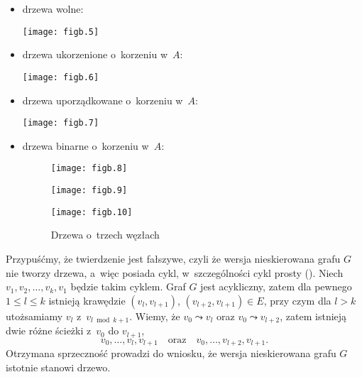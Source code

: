\exercise %
\begin{itemize}
	\item drzewa wolne:
	\begin{center}
		\texttt{[image: figb.5]}
	\end{center}
	\item drzewa ukorzenione o~korzeniu w~$A$:
	\begin{center}
		\texttt{[image: figb.6]}
	\end{center}
	\item drzewa uporządkowane o~korzeniu w~$A$:
	\begin{center}
		\texttt{[image: figb.7]}
	\end{center}
	\item drzewa binarne o~korzeniu w~$A$:
	\begin{figure}[ht]
		\begin{center}
			\texttt{[image: figb.8]}
		\end{center}
		\begin{center}
			\texttt{[image: figb.9]}
		\end{center}
		\begin{center}
			\texttt{[image: figb.10]}
		\end{center}
		\caption{Drzewa o~trzech węzłach}
	\end{figure}
\end{itemize}

\exercise %
Przypuśćmy, że twierdzenie jest fałszywe, czyli że wersja nieskierowana grafu $G$ nie tworzy drzewa, a~więc posiada cykl, w~szczególności cykl prosty (). Niech $v_1,v_2,\dots,v_k,v_1$ będzie takim cyklem. Graf $G$ jest acykliczny, zatem dla pewnego $1\le l\le k$ istnieją krawędzie $(v_l,v_{l+1})$, $(v_{l+2},v_{l+1})\in E$, przy czym dla $l>k$ utożsamiamy $v_l$ z~$v_{l\bmod k+1}$. Wiemy, że $v_0\leadsto v_l$ oraz $v_0\leadsto v_{l+2}$, zatem istnieją dwie różne ścieżki z~$v_0$ do $v_{l+1}$,
\[
	v_0,\dots,v_l,v_{l+1} \quad\text{oraz}\quad v_0,\dots,v_{l+2},v_{l+1}.
\]
Otrzymana sprzeczność prowadzi do wniosku, że wersja nieskierowana grafu $G$ istotnie stanowi drzewo.

